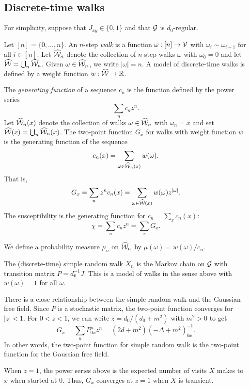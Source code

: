 \subsection{Discrete-time walks}

For simplicity, suppose that $J_{xy} \in \{ 0, 1 \}$ and that $\mathcal{G}$ is
$d_0$-regular.

Let $[n] = \{ 0, \ldots, n \}$.
An $n$-step \emph{walk} is a function $\omega : [n] \rightarrow \mathcal{V}$ with
$\omega_i \sim \omega_{i+1}$ for all $i \in [n]$. Let $\widehat{\mathcal{W}}_n$ denote the collection
of $n$-step walks $\omega$ with $\omega_0 = 0$ and let $\widehat{\mathcal{W}} = \bigcup_n \widehat{\mathcal{W}}_n$.
Given $\omega\in\widehat{\mathcal{W}}_n$, we write $|\omega| = n$.
A model of discrete-time walks is defined by a weight function $w : \widehat{\mathcal{W}} \rightarrow {\mathbb R}$.

The \emph{generating function} of a sequence $c_n$ is the function defined by
the power series
\begin{equation}
\sum_n c_n z^n.
\end{equation}
Let $\widehat{\mathcal{W}}_n(x)$ denote the collection of walks $\omega\in\widehat{\mathcal{W}}_n$ with $\omega_n = x$
and set $\widehat{\mathcal{W}}(x) = \bigcup_n \widehat{\mathcal{W}}_n(x)$.
The two-point function $G_x$ for walks with weight function $w$ is the generating
function of the sequence
\begin{equation}
c_n(x) = \sum_{\omega\in\widehat{\mathcal{W}}_n(x)} w(\omega).
\end{equation}
That is,
\begin{equation}
G_x = \sum_n z^n c_n(x)
	= \sum_{\omega\in\widehat{\mathcal{W}}(x)} w(\omega) z^{|\omega|}.
\end{equation}
The susceptibility is the generating function for $c_n = \sum_x c_n(x)$:
\begin{equation}
\chi = \sum_n c_n z^n = \sum_x G_x.
\end{equation}

We define a probability measure $\mu_n$ on $\widehat{\mathcal{W}}_n$ by $\mu(\omega) = w(\omega) / c_n$.


\begin{example}
The (discrete-time) simple random walk $X_n$ is the Markov chain on $\mathcal{G}$ with
transition matrix $P = d_0^{-1} J$. This is a model of walks in the sense above
with $w(\omega) = 1$ for all $\omega$.

There is a close relationship between the
simple random walk and the Gaussian free field. Since $P$ is a stochastic matrix,
the two-point function converges for $|z| < 1$. For $0 < z < 1$, we can write
$z = d_0 / (d_0 + m^2)$ with $m^2 > 0$ to get
\begin{equation}
G_x = \sum_n P^n_{0x} z^n = (2 d + m^2) (-\Delta + m^2)^{-1}_{0x}.
\end{equation}
In other words, the two-point function for simple random walk is the two-point
function for the Gaussian free field.

When $z = 1$, the power series above is the expected number of visits $X$ makes
to $x$ when started at $0$. Thus, $G_x$ converges at $z = 1$ when $X$ is transient.
\end{example}

